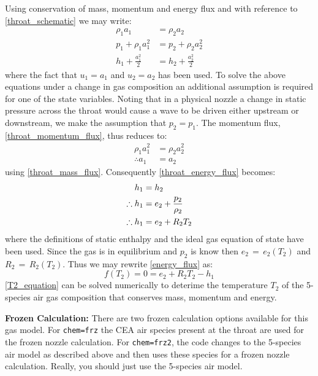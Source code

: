 Using conservation of mass, momentum and energy flux and with reference to \cref{throat_schematic} we may write:
\begin{align}
\rho_1a_1             &= \rho_2a_2 \label{throat_mass_flux}\\
p_1 + \rho_1a_1^2     &= p_2 + \rho_2a_2^2 \label{throat_momentum_flux}\\
h_1 + \frac{a_1^2}{2} &= h_2 + \frac{a_2^2}{2} \label{throat_energy_flux}
\end{align}
where the fact that $u_1 = a_1$ and $u_2 = a_2$ has been used. To solve the above equations under a change in gas composition an additional assumption is required for one of the state variables. Noting that in a physical nozzle a change in static pressure across the throat would cause a wave to be driven either upstream or downstream, we make the assumption that $p_2 = p_1$. The momentum flux, \cref{throat_momentum_flux}, thus reduces to:
\begin{align}
\rho_1a_1^2 &= \rho_2a_2^2\\
\therefore a_1 &= a_2
\end{align}
using \cref{throat_mass_flux}. Consequently \cref{throat_energy_flux} becomes:
\begin{align}
h_1 &= h_2 \notag \\
\therefore h_1 &= e_2 + \frac{p_2}{\rho_2} \notag \\
\therefore h_1 &= e_2 + R_2T_2 \label{energy_flux}
\end{align}
where the definitions of static enthalpy and the ideal gas equation of state have been used. Since the gas is in equilibrium and $p_2$ is know then $e_2\,=\,e_2(T_2)$ and $R_2\,=\,R_2(T_2)$. Thus we may rewrite \cref{energy_flux} as:
\begin{equation}
f(T_2) = 0 = e_2 + R_2T_2 - h_1 \label{T2_equation}
\end{equation}
\cref{T2_equation} can be solved numerically to deterime the temperature $T_2$ of the 5-species air gas composition that conserves mass, momentum and energy.

\textbf{Frozen Calculation:} There are two frozen calculation options available for this gas model. For \texttt{chem=frz} the CEA air species present at the throat are used for the frozen nozzle calculation. For \texttt{chem=frz2}, the code changes to the 5-species air model as described above and then uses these species for a frozen nozzle calculation. Really, you should just use the 5-species air model.
